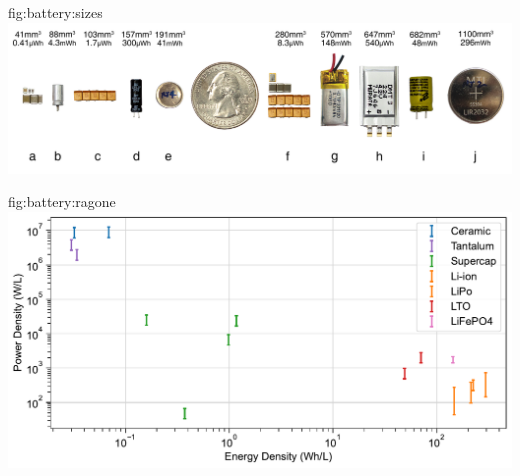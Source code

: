 \begin{definefigure}{fig:battery:sizes}
  \centering
  \includegraphics[width=\columnwidth]{figs/batteries/cap_lto_size_compare}
  \caption{
    A size comparison of energy storage methods including capacitors, supercapacitors, and batteries.
    \normalfont
    They are ordered left to right, by their
    (total) volume. Total volumes and energy storage are listed above the respective device.
    Configuration
    \textbf{(a)}, \textbf{(c)} and \textbf{(f)} represent the energy storage configurations used
    in the Flicker platfrom with BLE and several sensors~\cite{hesterFlicker17}, the Solar Monjolo~\cite{campbellEnergy14} and the Capybara temperature
    monitor and alarm~\cite{colinReconfigurable18}, which have total
    capacitances and energy capacities of 119\si{\micro\farad} (0.41\si{\micro\Wh} at 5~V), 500\si{\micro\farad} (1.7\si{\micro\Wh} at 5~V)
    and 8.8\si{\milli\farad} (8.3\si{\micro\Wh} at 2.6~V), respectively. Capacitors
    \textbf{(d)}~\cite{illinoisCap} and \textbf{(h)}~\cite{murataCap} are large
    supercapacitors available on the Capybara platform and have the
    capacitances and energy capacities of 300\si{\milli\farad} (300\si{\micro\Wh} at 2.7\si{\volt}) and 220\si{\milli\farad}
    (540\si{\micro\Wh} at 4.2\si{\volt}) respectively.  Devices \textbf{(b)} and \textbf{(i)} are 
    small LTO battery cells with 1.8\si{\milli\Ah} (4.3\si{\milli\Wh} at 2.4~V) and 20\si{\milli\Ah} (48\si{\milli\Wh}
    at 2.4\si{\volt}) capacity respectively~\cite{LTODatasheet2}. Devices \textbf{(e)} and \textbf{(j)} are small prototype Li-ion coin cells with 11\si{\milli\Ah} (41\si{\milli\Wh} at 3.7~V) and 80\si{\milli\Ah} (296\si{\milli\Wh} at 3.7~V) respectively~\cite{millibatNimbus}. Device \textbf{g} is a traditional Lithium Polymer pouch cell with 40\si{\milli\Ah} (148\si{\milli\Wh} at 3.7~V)~\cite{sparkfunPouch}.
    The LTO battery \textbf{(b)} and the Li-ion coin cell \textbf{(e)} are among the smallest of all configurations of energy storage
    presented here and also provide one to two orders of magnitude more energy capacity
    compared to \textbf{(f)}, the largest supercapacitor presented.
  }
\end{definefigure}

\begin{definefigure}{fig:battery:ragone}
\centering
\includegraphics[width=\columnwidth]{figs/ragone}
\caption{}
\end{definefigure}